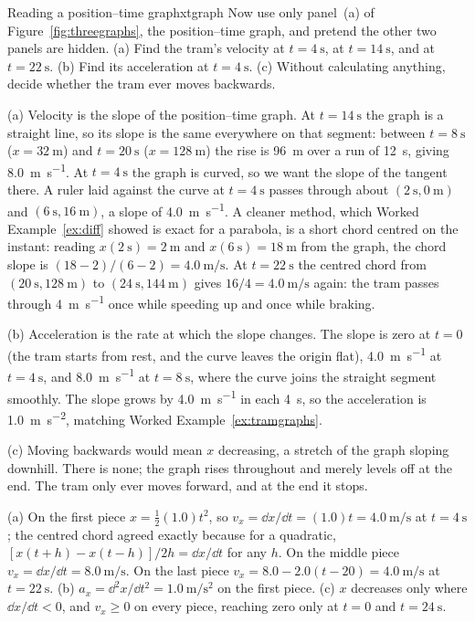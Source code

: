 \begin{example}{Reading a position--time graph}{xtgraph}
Now use only panel~(a) of Figure~\ref{fig:threegraphs}, the position--time graph, and pretend the other two panels are hidden. (a) Find the tram's velocity at $t = \SI{4}{\second}$, at $t = \SI{14}{\second}$, and at $t = \SI{22}{\second}$. (b) Find its acceleration at $t = \SI{4}{\second}$. (c) Without calculating anything, decide whether the tram ever moves backwards.

\elem (a) Velocity is the slope of the position--time graph. At $t = \SI{14}{\second}$ the graph is a straight line, so its slope is the same everywhere on that segment: between $t = \SI{8}{\second}$ ($x = \SI{32}{\metre}$) and $t = \SI{20}{\second}$ ($x = \SI{128}{\metre}$) the rise is \SI{96}{\metre} over a run of \SI{12}{\second}, giving \SI{8.0}{\metre\per\second}. At $t = \SI{4}{\second}$ the graph is curved, so we want the slope of the tangent there. A ruler laid against the curve at $t = \SI{4}{\second}$ passes through about $(\SI{2}{\second}, \SI{0}{\metre})$ and $(\SI{6}{\second}, \SI{16}{\metre})$, a slope of \SI{4.0}{\metre\per\second}. A cleaner method, which Worked Example~\ref{ex:diff} showed is exact for a parabola, is a short chord centred on the instant: reading $x(\SI{2}{\second}) = \SI{2}{\metre}$ and $x(\SI{6}{\second}) = \SI{18}{\metre}$ from the graph, the chord slope is $(18 - 2)/(6 - 2) = \SI{4.0}{\metre\per\second}$. At $t = \SI{22}{\second}$ the centred chord from $(\SI{20}{\second}, \SI{128}{\metre})$ to $(\SI{24}{\second}, \SI{144}{\metre})$ gives $16/4 = \SI{4.0}{\metre\per\second}$ again: the tram passes through \SI{4}{\metre\per\second} once while speeding up and once while braking.

(b) Acceleration is the rate at which the slope changes. The slope is zero at $t = 0$ (the tram starts from rest, and the curve leaves the origin flat), \SI{4.0}{\metre\per\second} at $t = \SI{4}{\second}$, and \SI{8.0}{\metre\per\second} at $t = \SI{8}{\second}$, where the curve joins the straight segment smoothly. The slope grows by \SI{4.0}{\metre\per\second} in each \SI{4}{\second}, so the acceleration is \SI{1.0}{\metre\per\second\squared}, matching Worked Example~\ref{ex:tramgraphs}.

(c) Moving backwards would mean $x$ decreasing, a stretch of the graph sloping downhill. There is none; the graph rises throughout and merely levels off at the end. The tram only ever moves forward, and at the end it stops.

\calc (a) On the first piece $x = \tfrac12(1.0)t^2$, so $v_x = \dd x/\dd t = (1.0)t = \SI{4.0}{\metre\per\second}$ at $t = \SI{4}{\second}$; the centred chord agreed exactly because for a quadratic, $[x(t+h) - x(t-h)]/2h = \dd x/\dd t$ for any $h$. On the middle piece $v_x = \dd x/\dd t = \SI{8.0}{\metre\per\second}$. On the last piece $v_x = 8.0 - 2.0(t - 20) = \SI{4.0}{\metre\per\second}$ at $t = \SI{22}{\second}$. (b) $a_x = \dd^2 x/\dd t^2 = \SI{1.0}{\metre\per\second\squared}$ on the first piece. (c) $x$ decreases only where $\dd x/\dd t < 0$, and $v_x \ge 0$ on every piece, reaching zero only at $t = 0$ and $t = \SI{24}{\second}$.


\end{example}
